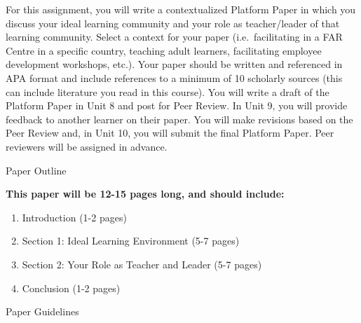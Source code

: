 \documentclass[
]{book}
\providecommand{\tightlist}{%
  \setlength{\itemsep}{0pt}\setlength{\parskip}{0pt}}
\begin{document}
\begin{assessment}
For this assignment, you will write a contextualized Platform Paper in which you discuss your ideal learning community and your role as teacher/leader of that learning community. Select a context for your paper (i.e.~facilitating in a FAR Centre in a specific country, teaching adult learners, facilitating employee development workshops, etc.).
Your paper should be written and referenced in APA format and include references to a minimum of 10 scholarly sources (this can include literature you read in this course).
You will write a draft of the Platform Paper in Unit 8 and post for Peer Review. In Unit 9, you will provide feedback to another learner on their paper. You will make revisions based on the Peer Review and, in Unit 10, you will submit the final Platform Paper. Peer reviewers will be assigned in advance.

{Paper Outline}

\textbf{This paper will be 12-15 pages long, and should include:}

\begin{enumerate}
\def\labelenumi{\arabic{enumi}.}
\tightlist
\item
  Introduction (1-2 pages)\\
\item
  Section 1: Ideal Learning Environment (5-7 pages)\\
\item
  Section 2: Your Role as Teacher and Leader (5-7 pages)\\
\item
  Conclusion (1-2 pages)
\end{enumerate}

{Paper Guidelines}


\end{assessment}
\end{document}
